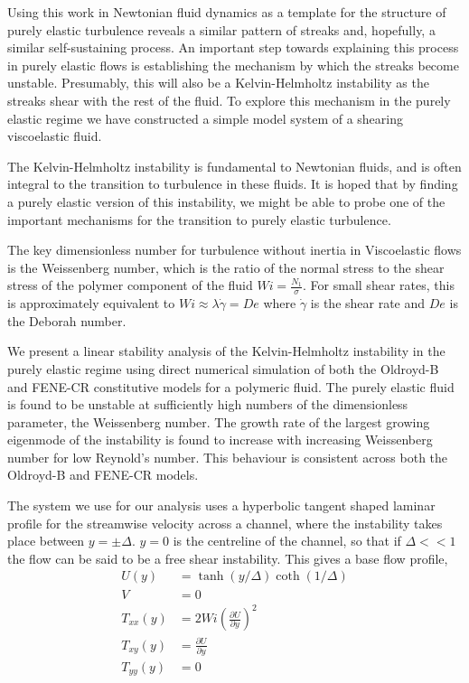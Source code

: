 \documentclass{jfm}
\newcommand{\dy}[1]{\frac{\partial #1}{\partial y}}
\begin{document}
Using this work in Newtonian fluid dynamics as a template for the structure of purely elastic turbulence reveals a similar pattern of streaks and, hopefully, a similar self-sustaining process. An important step towards explaining this process in purely elastic flows is establishing the mechanism by which the streaks become unstable. Presumably, this will also be a Kelvin-Helmholtz instability as the streaks shear with the rest of the fluid. To explore this mechanism in the purely elastic regime we have constructed a simple model system of a shearing viscoelastic fluid.

The Kelvin-Helmholtz instability is fundamental to Newtonian fluids, and is often integral to the transition to turbulence in these fluids. It is hoped that by finding a purely elastic version of this instability, we might be able to probe one of the important mechanisms for the transition to purely elastic turbulence.

The key dimensionless number for turbulence without inertia in Viscoelastic flows is the Weissenberg number, which is the ratio of the normal stress to the shear stress of the polymer component of the fluid $Wi = \frac{N_{1}}{\sigma}$. For small shear rates, this is approximately equivalent to $Wi \approx \lambda \dot{\gamma} = De$ where $\dot{\gamma}$ is the shear rate and $De$ is the Deborah number. 

We present a linear stability analysis of the Kelvin-Helmholtz instability in the purely elastic regime using direct numerical simulation of both the Oldroyd-B and FENE-CR constitutive models for a polymeric fluid. The purely elastic fluid is found to be unstable at sufficiently high numbers of the dimensionless parameter, the Weissenberg number. The growth rate of the largest growing eigenmode of the instability is found to increase with increasing Weissenberg number for low Reynold's number. This behaviour is consistent across both the Oldroyd-B and FENE-CR models.

The system we use for our analysis uses a hyperbolic tangent shaped laminar profile for the streamwise velocity across a channel, where the instability takes place between $y = \pm \Delta$. $y=0$ is the centreline of the channel, so that if $\Delta << 1$ the flow can be said to be a free shear instability. This gives a base flow profile,
\begin{align}
    U(y) &= \tanh \left( y/\Delta \right) \coth \left( 1/\Delta \right) \nonumber\\
    V &= 0 \nonumber \\
    T_{xx}(y) &= 2 Wi \left( \dy{U} \right)^{2} \nonumber \\
    T_{xy}(y) &= \dy{U} \nonumber \\
    T_{yy}(y) &= 0 \nonumber 
    \label{eq:KH_laminar_profile}
\end{align}
\end{document}
